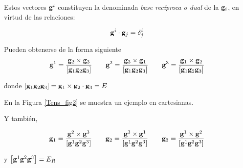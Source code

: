 \bigskip

Estos vectores $\bold{g}^{i}$  constituyen la denominada \textit{base recíproca o dual  } de la $\bold{g}_{i}$, en virtud de las relaciones:


\begin{eqnarray}\label{ec_11}
\bold{g}^{i}\cdot \bold{g}_{j}=\delta _{j} ^{i} 
\end{eqnarray}


Pueden obtenerse de la forma siguiente
\begin{eqnarray}\label{ec_12}
\bold{g}^{1}= \frac {\bold{g}_{2}\times \bold{g}_{3} }{\left[  \bold{g}_{1}\bold{g}_{2} \bold{g}_{3} \right]} \qquad
\bold{g}^{2}= \frac {\bold{g}_{3}\times \bold{g}_{1} }{\left[  \bold{g}_{1}\bold{g}_{2} \bold{g}_{3} \right]} \qquad
\bold{g}^{3}= \frac {\bold{g}_{1}\times \bold{g}_{2} }{\left[  \bold{g}_{1}\bold{g}_{2} \bold{g}_{3} \right]} 
\end{eqnarray}

\bigskip

\noindent
donde $\left[  \bold{g}_{1}\bold{g}_{2} \bold{g}_{3} \right]=\bold{g}_{1}\times \bold{g}_{2} \cdot \bold{g}_{3}=E  $ 

\bigskip

En la Figura \ref{Tens_fig2} se muestra un ejemplo en cartesianas.

Y también, 

\bigskip

\begin{eqnarray}\label{ec_13}
\bold{g}_{1}= \frac {\bold{g}^{2}\times \bold{g}^{3} }{\left[  \bold{g}^{1}\bold{g}^{2} \bold{g}^{3} \right]} \qquad
\bold{g}_{2}= \frac {\bold{g}^{3}\times \bold{g}^{1} }{\left[  \bold{g}^{1}\bold{g}^{2} \bold{g}^{3} \right]}  \qquad
\bold{g}_{3}= \frac {\bold{g}^{1}\times \bold{g}^{2} }{\left[  \bold{g}^{1}\bold{g}^{2} \bold{g}^{3} \right]} 
\end{eqnarray}

\bigskip

\noindent
y $\left[  \bold{g}^{1}\bold{g}^{2} \bold{g}^{3} \right]=E_R$



 





